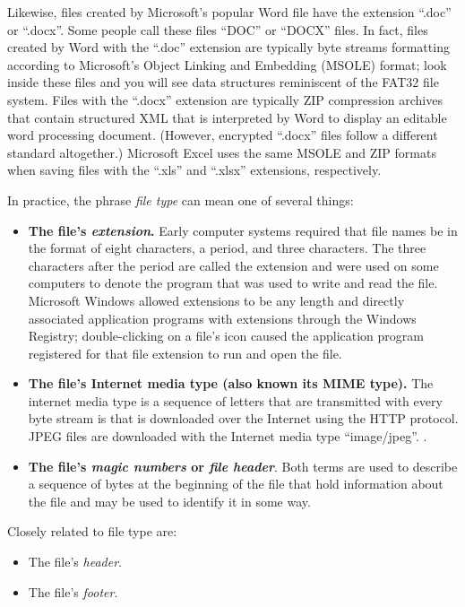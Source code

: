 Likewise, files created by Microsoft's popular Word file have the
extension ``.doc'' or ``.docx''. Some people call these files ``DOC''
or ``DOCX'' files. In fact, files created by Word with the ``.doc''
extension are typically byte streams formatting according to Microsoft's Object Linking and
Embedding (MSOLE) format; look inside these files and you will see data
structures reminiscent of the FAT32 file system. Files with the ``.docx'' extension are
typically ZIP compression archives that contain structured XML that is
interpreted by Word to display an editable word processing
document. (However, encrypted ``.docx'' files follow a different
standard altogether.)
Microsoft Excel uses the same MSOLE and ZIP formats when saving files
with the ``.xls'' and ``.xlsx'' extensions, respectively.

In practice, the phrase \emph{file type} can mean one of several things:

\begin{itemize}
\item \textbf{The file's \emph{extension}.} Early computer systems
  required that file names be in the format of eight characters, a
  period, and three characters. The three characters after the period
  are called the extension and were used on some computers to denote
  the program that was used to write and read the file. Microsoft
  Windows allowed extensions to be any length and directly associated
  application programs with extensions through the Windows Registry;
  double-clicking on a file's icon caused the application program
  registered for that file extension to run and open the file.
\item \textbf{The file's Internet media type (also known its MIME
  type).} The internet media type is a sequence of letters that are
  transmitted with every byte stream is that is downloaded over the
  Internet using the HTTP protocol. JPEG files are downloaded with the
  Internet media type ``image/jpeg''. . 
\item \textbf{The file's \emph{magic numbers} or \emph{file
    header}}. Both terms are used to describe a sequence of bytes at the
  beginning of the file that hold information about the file and may
  be used to identify it in some way.
\end{itemize}

Closely related to file type are:
\begin{itemize}
\item The file's \emph{header}.
\item The file's \emph{footer}.
\end{itemize}

